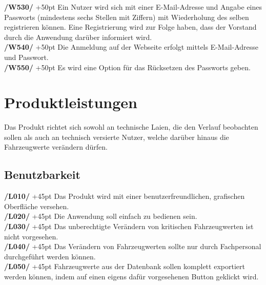 \documentclass[fontsize = 12pt, paper = a4]{scrreprt}
\begin{document}
\textbf{/W530/} 
\hangindent+50pt 
Ein Nutzer wird sich mit einer E-Mail-Adresse und Angabe eines Passworts (mindestens sechs Stellen mit Ziffern) mit Wiederholung des selben registrieren können. Eine Registrierung wird zur Folge haben, dass der Vorstand durch die Anwendung darüber informiert wird. \\

\textbf{/W540/}
\hangindent+50pt 
Die Anmeldung auf der Webseite erfolgt mittels E-Mail-Adresse und Passwort. \\

\textbf{/W550/} 
\hangindent+50pt 
Es wird eine Option für das Rücksetzen des Passworts geben. \\



\chapter{Produktleistungen}

Das Produkt richtet sich sowohl an technische Laien, die den Verlauf beobachten sollen als auch an technisch versierte Nutzer, welche darüber hinaus die Fahrzeugwerte verändern dürfen. 


\section{Benutzbarkeit}

\textbf{/L010/} 
\hangindent+45pt 
Das Produkt wird mit einer benutzerfreundlichen, grafischen Oberfläche versehen. \\

\textbf{/L020/} 
\hangindent+45pt 
Die Anwendung soll einfach zu bedienen sein. \\

\textbf{/L030/} 
\hangindent+45pt 
Das unberechtigte Verändern von kritischen Fahrzeugwerten ist nicht vorgesehen. \\

\textbf{/L040/} 
\hangindent+45pt 
Das Verändern von Fahrzeugwerten sollte nur durch Fachpersonal durchgeführt werden können. \\

\textbf{/L050/} 
\hangindent+45pt 
Fahrzeugwerte aus der Datenbank sollen komplett exportiert werden können, indem auf einen eigens dafür vorgesehenen Button geklickt wird. \\
\end{document}
